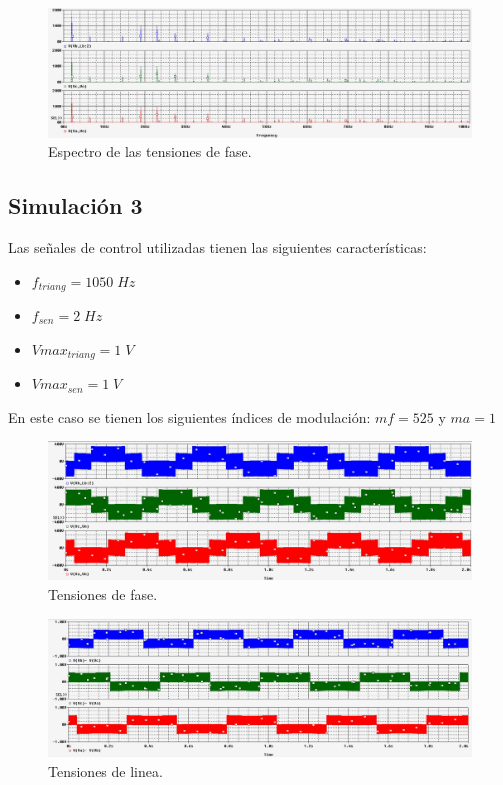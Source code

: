 \documentclass[11pt, a4paper]{article}
\begin{document}
\begin{figure}[h!]
\centering
\includegraphics[width=15cm]{Segundo/Espectro}
\caption{Espectro de las tensiones de fase.}
\label{fig:esp525}
\end{figure}

\newpage

\subsection{Simulación 3}
Las señales de control utilizadas tienen las siguientes características: 
\begin{itemize}
\item $f_{triang} = 1050 \; Hz$
\item $f_{sen} = 2 \; Hz$
\item $Vmax_{triang} = 1 \;V$
\item $Vmax_{sen} = 1 \; V$
\end{itemize}
En este caso se tienen los siguientes índices de modulación: $mf = 525$ y $ma = 1$


\begin{figure}[h!]
\centering
\includegraphics[width=15cm]{Tercero/Vfase}
\caption{Tensiones de fase.}
\label{fig:Vfase5.25}
\end{figure}

\begin{figure}[h!]
\centering
\includegraphics[width=15cm]{Tercero/Vlinea}
\caption{Tensiones de linea.}
\label{fig:Vlinea5.25}
\end{figure}
\end{document}
